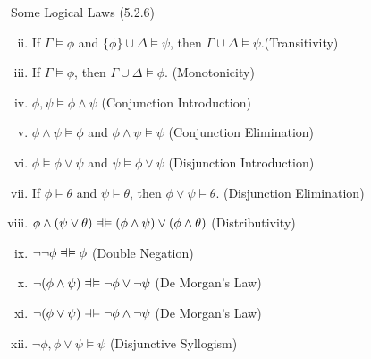 \documentclass[../slides.tex]{subfiles}
\begin{document}
\begin{frame}{Some Logical Laws (5.2.6)}

{\small

\begin{enumerate}[(i)]
			
				
				\setcounter{enumi}{1}
				
				\item If $\Gamma\vDash\phi$ and $\{\phi\}\cup\Delta\vDash\psi$, then $\Gamma\cup\Delta\vDash\psi$.\hfill (Transitivity)
			
				\item If $\Gamma\vDash\phi$, then $\Gamma\cup\Delta\vDash\phi$. \hfill(Monotonicity)
				
				\item $\phi,\psi\vDash\phi\land \psi$ \hfill(Conjunction Introduction)
				
				\item $\phi\land\psi\vDash\phi$ and $\phi\land\psi\vDash\psi$ \hfill (Conjunction Elimination)
				
				\item $\phi\vDash\phi\lor\psi$ and $\psi\vDash\phi\lor \psi$ \hfill (Disjunction Introduction)
				
				\item If $\phi\vDash\theta$ and $\psi\vDash\theta$, then $\phi\lor\psi\vDash\theta$. \hfill (Disjunction Elimination)
				
				\setcounter{enumi}{13}			
				\item $\phi\land(\psi\lor\theta)\equi (\phi\land\psi)\lor(\phi\land\theta)$ \hfill (Distributivity)
								\setcounter{enumi}{15}			

				
				\item $\neg\neg \phi\equi \phi$ \hfill (Double Negation)
				
				\item $\neg(\phi\land\psi)\equi \neg\phi\lor\neg\psi$ \hfill (De Morgan's Law)
				
				\item  $\neg(\phi\lor\psi)\equi \neg\phi\land\neg\psi$ \hfill (De Morgan's Law)
						
				\item $\neg\phi,\phi\lor \psi\vDash\psi$ \hfill (Disjunctive Syllogism)
				

\end{enumerate}}
\end{frame}
\end{document}

